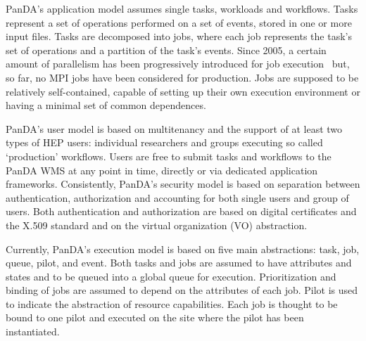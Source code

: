
PanDA's application model assumes single tasks, workloads and workflows. Tasks
represent a set of operations performed on a set of events, stored in one or
more input files. Tasks are decomposed into jobs, where each job represents the
task's set of operations and a partition of the task's events. Since 2005, a
certain amount of parallelism has been progressively introduced for job
execution~\cite{crooks2012multi} but, so far, no MPI jobs have been considered
for production. Jobs are supposed to be relatively self-contained, capable of
setting up their own execution environment or having a minimal set of common
dependences.


PanDA's user  model is based on multitenancy 
and the support of at least two types of HEP users: individual researchers and
groups executing so called `production' workflows. Users are free to submit
tasks and workflows to the PanDA WMS at any point in time, directly or via
dedicated application frameworks. Consistently, PanDA's security model is
based on separation between authentication, authorization and accounting for
both single users and group of users. Both authentication and authorization
are based on digital certificates and the X.509 standard and on the virtual
organization (VO) abstraction.

Currently, PanDA's execution model is based on five main abstractions: task,
job, queue, pilot, and event. Both tasks and jobs are assumed to have attributes
and states and to be queued into a global queue for execution. Prioritization
and binding of jobs are assumed to depend on the attributes of each job. Pilot
is used to indicate the abstraction of resource capabilities. Each job is
thought to be bound to one pilot and executed on the site where the pilot has
been instantiated.

